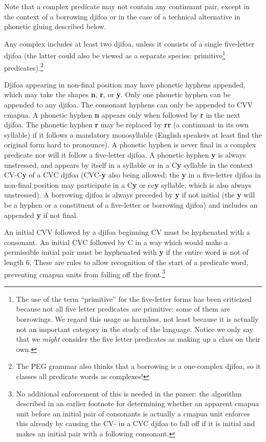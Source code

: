 \documentclass[12pt]{book}
\begin{document}
Note that a complex predicate may not contain any continuant pair, except in the context of a borrowing djifoa or in the case of a technical alternative in phonetic gluing described below.

Any complex includes at least two djifoa, unless it consists of a single five-letter djifoa (the latter could also be viewed as a separate species: primitive\footnote{The use of the term ``primitive'' for the five-letter forms has been criticized because not all five letter predicates are primitive:  some of them are borrowings.  We regard this usage as harmless, not least because it is actually not an important category in the study of the language.   Notice we only say that we {\em might\/} consider the five letter predicates as making up a class on their own.}  predicates).\footnote{The PEG grammar also thinks that a borrowing is a one-complex djifoa, so it classes all predicate words as complexes!}

Djifoa appearing in non-final position may have phonetic hyphens appended, which may take the shapes {\bf n}, {\bf r}, or {\bf y}.   Only one phonetic hyphen can be appended to any djifoa.  The consonant hyphens can only be appended to CVV cmapua.
A phonetic hyphen {\bf n} appears only when followed by {\bf r} in the next djifoa.  The phonetic hyphen {\bf r} may be replaced by {\bf rr} (a continuant in its own syllable) if it follows a mandatory monosyllable (English speakers at least find the original form hard to pronounce).  A phonetic hyphen is never final in a complex predicate nor will it follow a five-letter djifoa.  A phonetic hyphen {\bf y} is always unstressed, and appears by itself in a syllable or in a C{\bf y} syllable in the context CV-C{\bf y} of a CVC djifoa (CVC-{\bf y} also being allowed;  the {\bf y} in a five-letter djifoa in non-final position may participate in a C{\bf y} or cc{\bf y} syllable, which is also always unstressed).  A borrowing djifoa is always preceded by {\bf y} if not initial (the {\bf y} will be a hyphen or a constituent of a five-letter or borrowing djifoa) and includes an appended {\bf y} if not final.

An initial CVV followed by a djifoa beginning CV must be hyphenated with a consonant.  An initial CVC followed by C in a way which would make
a permissible initial pair must be hyphenated with {\bf y} if the entire word is not of length 6.  These are rules to allow recognition of the start of
a predicate word, preventing cmapua units from falling off the front.\footnote{No additional enforcement of this is needed in the parser:  the algorithm described in an earlier footnote for determining whether an apparent cmapua unit before an initial pair of consonants is actually a cmapua unit enforces this already by causing the CV- in a CVC djifoa to fall off if it is initial and makes an initial pair with a following consonant.}
\end{document}
